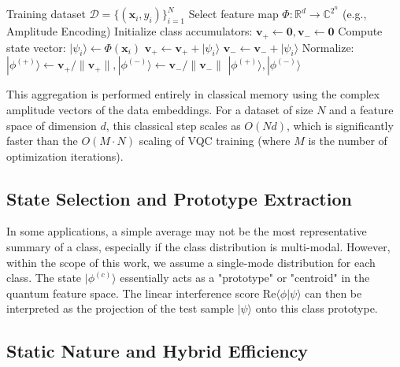\documentclass[conference]{IEEEtran}
\begin{document}
\begin{algorithm}[ht]
\caption{Static Learning of Class-Representative States}
\label{alg:learning}
\begin{algorithmic}[1]
\REQUIRE Training dataset $\mathcal{D} = \{(\mathbf{x}_i, y_i)\}_{i=1}^N$
\STATE Select feature map $\Phi: \mathbb{R}^d \rightarrow \mathbb{C}^{2^n}$ (e.g., Amplitude Encoding)
\STATE Initialize class accumulators: $\mathbf{v}_+ \leftarrow \mathbf{0}, \mathbf{v}_- \leftarrow \mathbf{0}$
    \STATE Compute state vector: $|\psi_i\rangle \leftarrow \Phi(\mathbf{x}_i)$
        \STATE $\mathbf{v}_+ \leftarrow \mathbf{v}_+ + |\psi_i\rangle$
    \ELSE
        \STATE $\mathbf{v}_- \leftarrow \mathbf{v}_- + |\psi_i\rangle$
    \ENDIF
\ENDFOR
\STATE Normalize: $|\phi^{(+)}\rangle \leftarrow \mathbf{v}_+/\|\mathbf{v}_+\|, |\phi^{(-)}\rangle \leftarrow \mathbf{v}_-/\|\mathbf{v}_-\|$
\RETURN $|\phi^{(+)}\rangle, |\phi^{(-)}\rangle$
\end{algorithmic}
\end{algorithm}

This aggregation is performed entirely in classical memory using the complex amplitude vectors of the data embeddings. For a dataset of size $N$ and a feature space of dimension $d$, this classical step scales as $O(Nd)$, which is significantly faster than the $O(M \cdot N)$ scaling of VQC training (where $M$ is the number of optimization iterations).

\subsection{State Selection and Prototype Extraction}

In some applications, a simple average may not be the most representative summary of a class, especially if the class distribution is multi-modal. However, within the scope of this work, we assume a single-mode distribution for each class. The state $|\phi^{(c)}\rangle$ essentially acts as a "prototype" or "centroid" in the quantum feature space. The linear interference score $\text{Re}\langle \phi | \psi \rangle$ can then be interpreted as the projection of the test sample $|\psi\rangle$ onto this class prototype. 

\subsection{Static Nature and Hybrid Efficiency}
\end{document}
